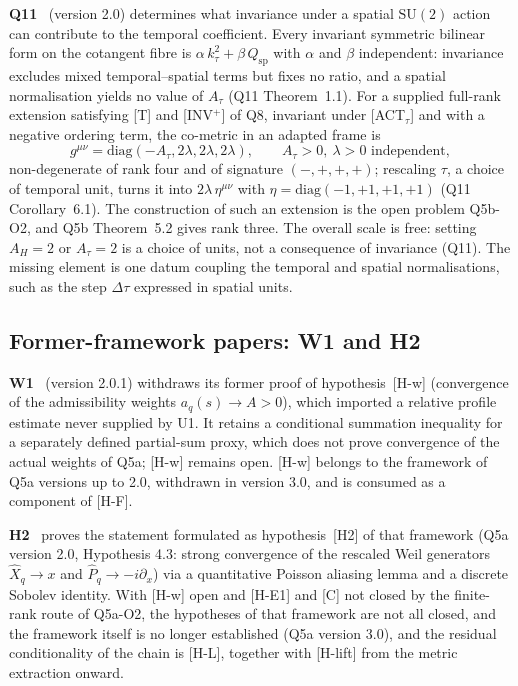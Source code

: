 \documentclass[11pt,a4paper]{article}
\theoremstyle{definition}
\newcommand{\SU}{\mathrm{SU}}
\newcommand{\geff}{g^{\mu\nu}}
\newcommand{\Atau}{A_\tau}
\newcommand{\AH}{A_H}
\begin{document}
      \textbf{Q11}~\cite{Beau2026q11} (version 2.0) determines what invariance under a spatial
      $\SU(2)$ action can contribute to the temporal coefficient.
      Every invariant symmetric bilinear form on the cotangent fibre is
      $\alpha\,k_\tau^2 + \beta\,Q_{\mathrm{sp}}$ with $\alpha$ and $\beta$ independent: invariance
      excludes mixed temporal--spatial terms but fixes no ratio, and a spatial normalisation
      yields no value of $\Atau$ (Q11 Theorem~1.1).
      For a supplied full-rank extension satisfying [T] and [INV$^+$] of Q8, invariant under
      [ACT$_\tau$] and with a negative ordering term, the co-metric in an adapted frame is
      \begin{equation}
        \label{eq:metric}
        \geff = \mathrm{diag}(-\Atau, 2\lambda, 2\lambda, 2\lambda),
        \qquad \Atau > 0,\ \lambda > 0 \text{ independent},
      \end{equation}
      non-degenerate of rank four and of signature $(-,+,+,+)$; rescaling $\tau$, a choice of
      temporal unit, turns it into $2\lambda\,\eta^{\mu\nu}$ with
      $\eta = \mathrm{diag}(-1, +1, +1, +1)$ (Q11 Corollary~6.1).
      The construction of such an extension is the open problem Q5b-O2, and Q5b Theorem~5.2
      gives rank three.
      The overall scale is free: setting $\AH = 2$ or $\Atau = 2$ is a choice of units, not a
      consequence of invariance (Q11).
      The missing element is one datum coupling the temporal and spatial normalisations, such as
      the step $\Delta\tau$ expressed in spatial units.

    \subsection{Former-framework papers: W1 and H2}
      \label{sec:closure}

      \textbf{W1}~\cite{Beau2026w1} (version 2.0.1) withdraws its former proof of
      hypothesis~[H-w] (convergence of the admissibility weights $a_q(s) \to A > 0$), which
      imported a relative profile estimate never supplied by U1.
      It retains a conditional summation inequality for a separately defined partial-sum proxy,
      which does not prove convergence of the actual weights of Q5a; [H-w] remains open.
      [H-w] belongs to the framework of Q5a versions up to 2.0, withdrawn in version 3.0, and is
      consumed as a component of [H-F].

      \textbf{H2}~\cite{Beau2026h2} proves the statement formulated as hypothesis~[H2] of that
      framework (Q5a version 2.0, Hypothesis 4.3: strong convergence of the rescaled
      Weil generators $\hat{X}_q \to x$ and $\hat{P}_q \to -i\partial_x$) via a quantitative
      Poisson aliasing lemma and a discrete Sobolev identity.
      With [H-w] open and [H-E1] and [C] not closed by the finite-rank route of Q5a-O2, the
      hypotheses of that framework are not all closed, and the framework itself is no longer
      established (Q5a version 3.0),
      and the residual conditionality of the chain is [H-L], together with [H-lift] from the
      metric extraction onward.
\end{document}
